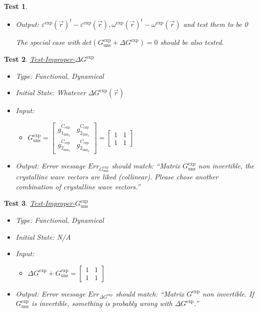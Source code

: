 \documentclass[12pt, titlepage]{article}
\newtheorem{Test}{Test}
\begin{document}
\begin{Test}
\begin{itemize}
\item Output:  ${\varepsilon^{\text{exp}}(\vec{r})}^{t}-\varepsilon^{\text{exp}}(\vec{r}), {\omega^{\text{exp}}(\vec{r})}^{t}- \omega^{\text{exp}}(\vec{r})$  and test them to be 0

The special case with $det(G_{\text{uns}}^{\text{exp}}+\Delta G^{\text{exp}})=0$ should be also tested.
\end{itemize}
\end{Test}

\begin{Test}\normalfont\underline{Test-Improper-$\Delta G^{\text{exp}}$}
\label{T_Bad-G_ref}
\begin{itemize}
\item Type: Functional, Dynamical
\item Initial State: Whatever $\Delta G^{\text{exp}}(\vec{r})$
\item Input:
\begin{itemize}
	\item $G_{\text{uns}}^{\text{exp}} =
	\begin{bmatrix}
	g_{1_{{\text{uns}}_x}}^{C_{\text{exp}}} & g_{2_{{\text{uns}}_x}}^{C_{\text{exp}}} \\
	g_{2_{{\text{uns}}_x}}^{C_{\text{exp}}} & g_{2_{{\text{uns}}_y}}^{C_{\text{exp}}} 
	\end{bmatrix} =\begin{bmatrix}
	1 & 1 \\
	1 & 1 
	\end{bmatrix} $
	\end{itemize} 
\item Output:
Error message $Err_{G_{\text{uns}}^{\text{exp}}}$ should match: \enquote{Matrix $G_{\text{uns}}^{\text{exp}}$ non invertible, the crystalline wave vectors are liked (collinear). Please chose another combination of crystalline wave vectors.}
\end{itemize}
\end{Test}

\begin{Test}\normalfont\underline{Test-Improper-$G_{\text{uns}}^{\text{exp}}$}
\label{T_Bad-Delta-G}
\begin{itemize}
\item Type: Functional, Dynamical
\item Initial State: N/A
\item Input:
\begin{itemize}
	\item $\Delta G^{\text{exp}}+G_{\text{uns}}^{\text{exp}} =
	\begin{bmatrix}
	1 & 1 \\
	1 & 1 
	\end{bmatrix} $
	\end{itemize} 
\item Output:
Error message $Err_{\Delta G^{\text{exp}}}$ should match: \enquote{Matrix $G^{\text{exp}}$ non invertible. If  $G_{\text{uns}}^{\text{exp}}$ is invertible, something is probably wrong with $\Delta G^{\text{exp}}$.}
\end{itemize}
\end{Test}
\end{document}
